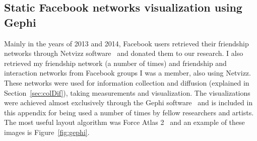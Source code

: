 \begin{apendicesenv}
	\subsection{Static Facebook networks visualization using Gephi}\label{sec:gephi}
	Mainly in the years of 2013 and 2014, Facebook users retrieved their friendship networks through Netvizz software~\cite{netvizz}
	and donated them to our research.
	I also retrieved my friendship network (a number of times) 
	and friendship and interaction networks from Facebook groups I was a member, also using Netvizz.
	These networks were used for information collection and diffusion (explained in Section~\ref{sec:colDif}),
	taking measurements and visualization.
	The visualizations were achieved almost exclusively through the Gephi software~\cite{gephi}
	and is included in this appendix for being used a number of times by fellow researchers and artists.
	The most useful layout algorithm was Force Atlas 2~\cite{fa2} and an example of these images is Figure~\ref{fig:gephi}.



\end{apendicesenv}
